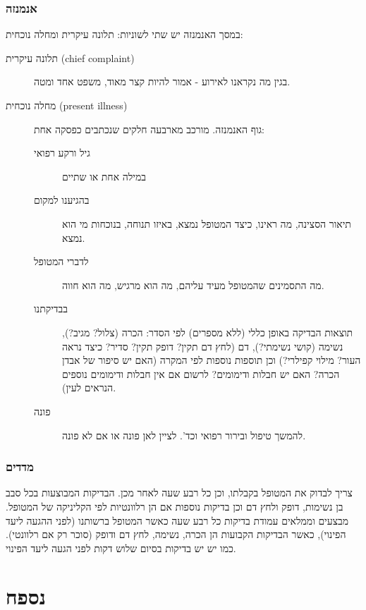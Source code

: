 \documentclass{article}
\begin{document}
\subsubsection{אנמנזה}
במסך האנמנזה יש שתי לשוניות: תלונה עיקרית ומחלה נוכחית:
\begin{description}
    \item[תלונה עיקרית (\textenglish{chief complaint})] בגין מה נקראנו לאירוע - אמור להיות קצר מאוד, משפט אחד ומטה.
    \item[מחלה נוכחית (\textenglish{present illness})] גוף האנמנזה. מורכב מארבעה חלקים שנכתבים כפסקה אחת: 
        \begin{description}
            \item[גיל ורקע רפואי] במילה אחת או שתיים
            \item[בהגיענו למקום] תיאור הסצינה, מה ראינו, כיצד המטופל נמצא, באיזו תנוחה, בנוכחות מי הוא נמצא.
            \item[לדברי המטופל] מה התסמינים שהמטופל מעיד עליהם, מה הוא מרגיש, מה הוא חווה.
            \item[בבדיקתנו] תוצאות הבדיקה באופן כללי (ללא מספרים) לפי הסדר: הכרה (צלול? מגיב?), נשימה (קושי נשימתי?), דם (לחץ דם תקין? דופק תקין? סדיר? כיצד נראה העור? מילוי קפילרי?) וכן תוספות נוספות לפי המקרה (האם יש סיפור של אבדן הכרה? האם יש חבלות ודימומים? לרשום אם אין חבלות ודימומים נוספים הנראים לעין).
            \item[פונה] להמשך טיפול ובירור רפואי וכד'. לציין לאן פונה או אם לא פונה.
        \end{description}
\end{description}

\subsubsection{מדדים}
צריך לבדוק את המטופל בקבלתו, וכן כל רבע שעה לאחר מכן. הבדיקות המבוצעות בכל סבב בן נשימות, דופק ולחץ דם וכן בדיקות נוספות אם הן רלוונטיות לפי הקליניקה של המטופל.
מבצעים וממלאים עמודת בדיקות כל רבע שעה כאשר המטופל ברשותנו (לפני ההגעה ליעד הפינוי), כאשר הבדיקות הקבועות הן הכרה, נשימה, לחץ דם ודופק (סוכר רק אם רלוונטי). כמו יש יש בדיקות בסיום שלוש דקות לפני הגעה ליעד הפינוי.

\section{נספח}
\end{document}
